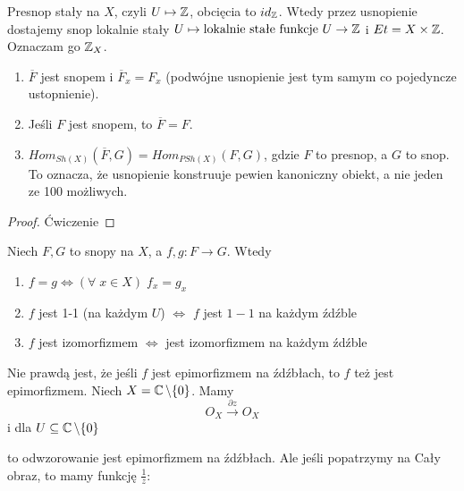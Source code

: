 \begin{example}
  \item Presnop stały na $X$, czyli $U\mapsto \operatorname{\mathbb{Z}}$, obcięcia to $id_{\operatorname{\mathbb{Z}}}$. Wtedy przez usnopienie dostajemy snop lokalnie stały $U\mapsto \text{lokalnie stałe funkcje }U\to \operatorname{\mathbb{Z}}$ i $Et=X\times \operatorname{\mathbb{Z}}$. Oznaczam go $\operatorname{\mathbb{Z}}_X$.
\end{example}

\begin{fact}
  \begin{enumerate}
    \item $\overline{F}$ jest snopem i $\overline{F}_x=F_x$ (podwójne usnopienie jest tym samym co pojedyncze ustopnienie).
    \item Jeśli $F$ jest snopem, to $\overline{F}=F$.
    \item $Hom_{Sh(X)}(\overline{F}, G)=Hom_{PSh(X)}(F, G)$, gdzie $F$ to presnop, a $G$ to snop. To oznacza, że usnopienie konstruuje pewien kanoniczny obiekt, a nie jeden ze 100 możliwych.
  \end{enumerate}
\end{fact}

\begin{proof}
  Ćwiczenie
\end{proof}

\begin{fact}
  Niech $F, G$ to snopy na $X$, a $f,g:F\to G$. Wtedy
  \begin{enumerate}
    \item $f=g\iff (\forall\;x\in X)\;f_x=g_x$
    \item $f$ jest 1-1 (na każdym $U$) $\iff$ $f$ jest $1-1$ na każdym źdźble
    \item $f$ jest izomorfizmem $\iff$ jest izomorfizmem na każdym źdźble
  \end{enumerate}
\end{fact}

\begin{example}
\item Nie prawdą jest, że jeśli $f$ jest epimorfizmem na źdźbłach, to $f$ też jest epimorfizmem. Niech $X=\operatorname{\mathbb{C}}\setminus\{0\}$. Mamy
  $$O_X\xrightarrow{\partial z} O_X$$
  i dla $U\subseteq \operatorname{\mathbb{C}}\setminus\{0\}$ 
  \begin{center}\end{center}
  to odwzorowanie jest epimorfizmem na źdźbłach. Ale jeśli popatrzymy na Cały obraz, to mamy funkcję $\frac{1}{z}$:
  \begin{center}\end{center}
\end{example}

